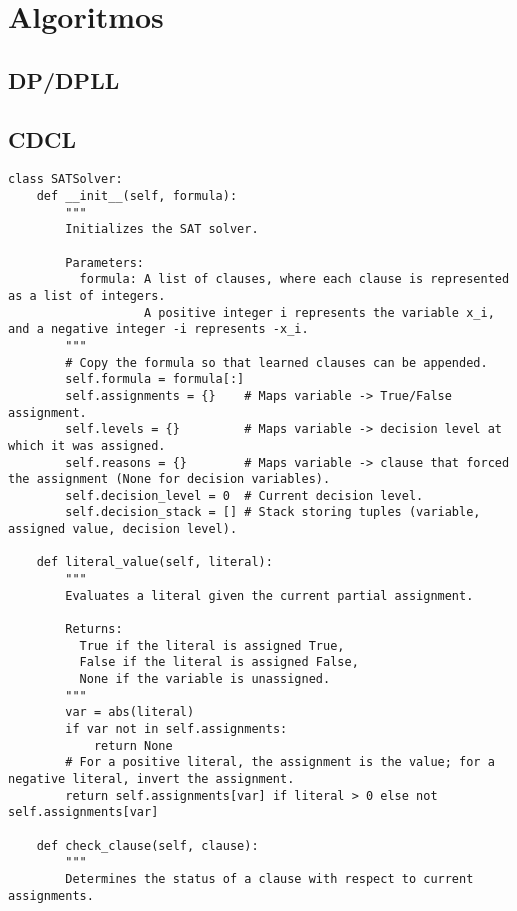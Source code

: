 \chapter{Algoritmos}
\label{chapter:algorithms}

\section{DP/DPLL}




\section{CDCL}

\begin{lstlisting}
class SATSolver:
    def __init__(self, formula):
        """
        Initializes the SAT solver.
        
        Parameters:
          formula: A list of clauses, where each clause is represented as a list of integers.
                   A positive integer i represents the variable x_i, and a negative integer -i represents -x_i.
        """
        # Copy the formula so that learned clauses can be appended.
        self.formula = formula[:]  
        self.assignments = {}    # Maps variable -> True/False assignment.
        self.levels = {}         # Maps variable -> decision level at which it was assigned.
        self.reasons = {}        # Maps variable -> clause that forced the assignment (None for decision variables).
        self.decision_level = 0  # Current decision level.
        self.decision_stack = [] # Stack storing tuples (variable, assigned value, decision level).

    def literal_value(self, literal):
        """
        Evaluates a literal given the current partial assignment.
        
        Returns:
          True if the literal is assigned True,
          False if the literal is assigned False,
          None if the variable is unassigned.
        """
        var = abs(literal)
        if var not in self.assignments:
            return None
        # For a positive literal, the assignment is the value; for a negative literal, invert the assignment.
        return self.assignments[var] if literal > 0 else not self.assignments[var]

    def check_clause(self, clause):
        """
        Determines the status of a clause with respect to current assignments.
        

\end{lstlisting}
